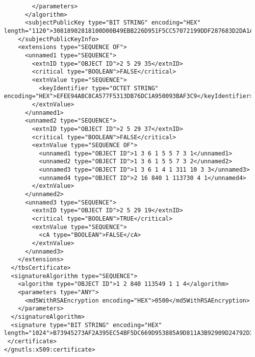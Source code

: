 \begin{verbatim}
        </parameters>
      </algorithm>
      <subjectPublicKey type="BIT STRING" encoding="HEX" length="1120">30818902818100D00B49EBB226D951F5CC57072199DDF287683D2DA1A0EFCC96BFF73164777C78C3991E92EDA66584E7B97BAB4BE68D595D225557E01E7E57B5C35C04B491948C5C427AD588D8C6989764996D6D44E17B65CCFC86F3B4842DE559B730C1DE3AEF1CE1A328AFF8A357EBA911E1F7E8FC1598E21E4BF721748C587F50CF46157D950203010001</subjectPublicKey>
    </subjectPublicKeyInfo>
    <extensions type="SEQUENCE OF">
      <unnamed1 type="SEQUENCE">
        <extnID type="OBJECT ID">2 5 29 35</extnID>
        <critical type="BOOLEAN">FALSE</critical>
        <extnValue type="SEQUENCE">
          <keyIdentifier type="OCTET STRING" encoding="HEX">EFEE94ABC8CA577F5313DB76DC1A950093BAF3C9</keyIdentifier>
        </extnValue>
      </unnamed1>
      <unnamed2 type="SEQUENCE">
        <extnID type="OBJECT ID">2 5 29 37</extnID>
        <critical type="BOOLEAN">FALSE</critical>
        <extnValue type="SEQUENCE OF">
          <unnamed1 type="OBJECT ID">1 3 6 1 5 5 7 3 1</unnamed1>
          <unnamed2 type="OBJECT ID">1 3 6 1 5 5 7 3 2</unnamed2>
          <unnamed3 type="OBJECT ID">1 3 6 1 4 1 311 10 3 3</unnamed3>
          <unnamed4 type="OBJECT ID">2 16 840 1 113730 4 1</unnamed4>
        </extnValue>
      </unnamed2>
      <unnamed3 type="SEQUENCE">
        <extnID type="OBJECT ID">2 5 29 19</extnID>
        <critical type="BOOLEAN">TRUE</critical>
        <extnValue type="SEQUENCE">
          <cA type="BOOLEAN">FALSE</cA>
        </extnValue>
      </unnamed3>
    </extensions>
  </tbsCertificate>
  <signatureAlgorithm type="SEQUENCE">
    <algorithm type="OBJECT ID">1 2 840 113549 1 1 4</algorithm>
    <parameters type="ANY">
      <md5WithRSAEncryption encoding="HEX">0500</md5WithRSAEncryption>
    </parameters>
  </signatureAlgorithm>
  <signature type="BIT STRING" encoding="HEX" length="1024">B73945273AF2A395EC54BF5DC669D953885A9D811A3B92909D24792D36A44EC27E1C463AF8738BEFD29B311CCE8C6D9661BEC30911DAABB39B8813382B32D2E259581EBCD26C495C083984763966FF35D1DEFE432891E610C85072578DA7423244A8F5997B41A1F44E61F4F22C94375775055A5E72F25D5E4557467A91BD4251</signature>
 </certificate>
</gnutls:x509:certificate>

\end{verbatim}
